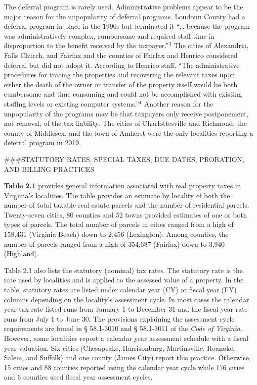 \documentclass[
]{book}
\begin{document}
The deferral program is rarely used. Administrative problems appear to be the major reason for the unpopularity of deferral programs. Loudoun County had a deferral program in place in the 1990s but terminated it ``\ldots{} because the program was administratively complex, cumbersome and required staff time in disproportion to the benefit received by the taxpayer.''\(^3\) The cities of Alexandria, Falls Church, and Fairfax and the counties of Fairfax and Henrico considered deferral but
did not adopt it. According to Henrico staff, ``The administrative procedures for tracing the properties and recovering the
relevant taxes upon either the death of the owner or transfer of the property itself would be both cumbersome and time consuming and could not be accomplished with existing staffing levels or existing computer systems.''\(^4\) Another reason for the unpopularity of the programs may be that taxpayers only receive postponement, not removal, of the tax liability. The cities of Charlottesville and Richmond, the county of Middlesex, and the town of Amherst were the only localities reporting a deferral program in 2019.

\#\#\#STATUTORY RATES, SPECIAL TAXES, DUE DATES, PRORATION, AND BILLING PRACTICES

\textbf{Table 2.1} provides general information associated with real property taxes in Virginia's localities. The table provides
an estimate by locality of both the number of total taxable real estate parcels and the number of residential parcels.
Twenty-seven cities, 80 counties and 52 towns provided estimates of one or both types of parcels. The total number of parcels in cities ranged from a high of 158,431 (Virginia Beach) down to 2,456 (Lexington). Among counties, the number of parcels ranged from a high of 354,687 (Fairfax) down to 3,940 (Highland).

Table 2.1 also lists the statutory (nominal) tax rates. The statutory rate is the rate used by localities and is applied to the assessed value of a property. In the table, statutory rates are listed under calendar year (CY) or fiscal year (FY) columns depending on the locality's assessment cycle. In most cases the calendar year tax rate listed runs from January 1 to December 31 and the fiscal year rate runs from July 1 to June 30. The provisions explaining the assessment cycle requirements are found in § 58.1-3010 and § 58.1-3011 of the \emph{Code of Virginia}. However, some localities report a calendar year assessment schedule with a fiscal year valuation. Six cities (Chesapeake, Harrisonburg, Martinsville, Roanoke, Salem, and Suffolk) and one county (James City) report this practice. Otherwise, 15 cities and 88 counties reported using the calendar year cycle while 176 cities and 6 counties used fiscal year assessment cycles.
\end{document}
